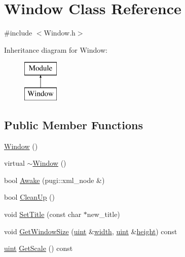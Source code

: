 \hypertarget{class_window}{}\section{Window Class Reference}
\label{class_window}


{\ttfamily \#include $<$Window.\+h$>$}

Inheritance diagram for Window\+:\begin{figure}[H]
\begin{center}
\leavevmode
\includegraphics[height=2.000000cm]{class_window}
\end{center}
\end{figure}
\subsection*{Public Member Functions}
\begin{DoxyCompactItemize}
\item 
\mbox{\hyperlink{class_window_a74e6087da23d3c24e9fac0245e5ec92c}{Window}} ()
\item 
virtual \mbox{\hyperlink{class_window_a245d821e6016fa1f6970ccbbedd635f6}{$\sim$\+Window}} ()
\item 
bool \mbox{\hyperlink{class_window_a0b02015257037d885d85afb77d0a3605}{Awake}} (pugi\+::xml\+\_\+node \&)
\item 
bool \mbox{\hyperlink{class_window_aed8304cc37c842ff56f5428524163fea}{Clean\+Up}} ()
\item 
void \mbox{\hyperlink{class_window_acc92146b568ce9b148db0d70653ebd5b}{Set\+Title}} (const char $\ast$new\+\_\+title)
\item 
void \mbox{\hyperlink{class_window_ad113a4ecdb4b2b366f4cb96d4fb2c9db}{Get\+Window\+Size}} (\mbox{\hyperlink{_defs_8h_a91ad9478d81a7aaf2593e8d9c3d06a14}{uint}} \&\mbox{\hyperlink{class_window_af5b1c436782cc9752d386493fbc5dc8c}{width}}, \mbox{\hyperlink{_defs_8h_a91ad9478d81a7aaf2593e8d9c3d06a14}{uint}} \&\mbox{\hyperlink{class_window_af0ac1732ca6b79a6f6b78aa344140514}{height}}) const
\item 
\mbox{\hyperlink{_defs_8h_a91ad9478d81a7aaf2593e8d9c3d06a14}{uint}} \mbox{\hyperlink{class_window_ad659334e5d8a448fafbb5a0262b2ac9a}{Get\+Scale}} () const
\end{DoxyCompactItemize}
